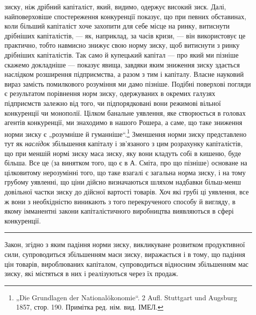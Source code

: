 \parcont{}  %
зиску, ніж дрібний капіталіст, який, видимо, одержує високий зиск. Далі, найповерховіше
спостереження конкуренції показує, що при певних обставинах, коли більший капіталіст хоче захопити
для себе місце на ринку, витиснути дрібніших капіталістів, — як, наприклад, за часів кризи, — він
використовує це практично, тобто навмисно знижує свою норму зиску, щоб витиснути з ринку дрібніших
капіталістів. Так само й купецький капітал — про який ми пізніше скажемо докладніше — показує явища,
завдяки яким зниження зиску здається наслідком розширення підприємства, а разом з тим і капіталу.
Власне науковий вираз замість помилкового розуміння ми дамо пізніше. Подібні поверхові погляди є
результатом порівнення норм зиску, одержуваних в окремих галузях підприємств залежно від того, чи
підпорядковані вони режимові вільної конкуренції чи монополії. Цілком банальне уявлення, яке
створюється в головах агентів конкуренції, ми знаходимо в нашого Рошера, а саме, що таке зниження
норми зиску є „розумніше й гуманніше“.\footnote*{
„Die Grundlagen der Nationalökonomie“. 2 Aufl. Stuttgart und Augsburg 1857,
стор. 190. Примітка ред. нім. вид. ІМЕЛ.
} Зменшення норми зиску представлено тут як \emph{наслідок}
збільшення капіталу і зв’язаного з цим розрахунку капіталістів, що при меншій нормі зиску маса
зиску, яку вони кладуть собі в кишеню, буде більша. Все це (за винятком того, що є в А. Сміта, про
що пізніше) основане на цілковитому нерозумінні того, що таке взагалі є загальна норма зиску, і на
тому грубому уявленні, що ціни дійсно визначаються шляхом надбавки більш-менш довільної частки зиску
до дійсної вартості товарів. Хоч які грубі ці уявлення, все ж вони з необхідністю виникають з того
перекрученого способу й вигляду, в якому імманентні закони капіталістичного виробництва виявляються
в сфері конкуренції.

\pfbreak{}

Закон, згідно з яким падіння норми зиску, викликуване розвитком продуктивної сили, супроводиться
збільшенням маси зиску, виражається і в тому, що падіння цін товарів, вироблюваних капіталом,
супроводиться відносним збільшенням мас зиску, які містяться в них і реалізуються через їх продаж.

